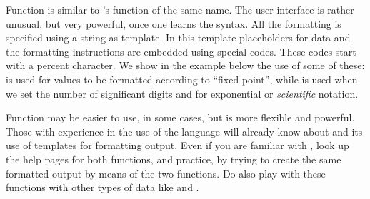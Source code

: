 \documentclass[krantz2]{krantz}\usepackage{knitr}%
\begin{document}
Function  is similar to \Clang's function of the same name. The user interface is rather unusual, but very powerful, once one learns the syntax. All the formatting is specified using a  string as template. In this template placeholders for data and the formatting instructions are embedded using special codes. These codes start with a percent character. We show in the example below the use of some of these:  is used for  values to be formatted according to ``fixed point'', while  is used when we set the number of significant digits and  for exponential or \emph{scientific} notation.

\begin{knitrout}\footnotesize
{}\color{fgcolor}
\end{knitrout}

\begin{playground}
Function  may be easier to use, in some cases, but  is more flexible and powerful. Those with experience in the use of the \Clang language will already know about  and its use of templates for formatting output. Even if you are familiar with  \Clang, look up the help pages for both functions, and practice, by trying to create the same formatted output by means of the two functions. Do also play with these functions with other types of data like  and .
\end{playground}
\end{document}
